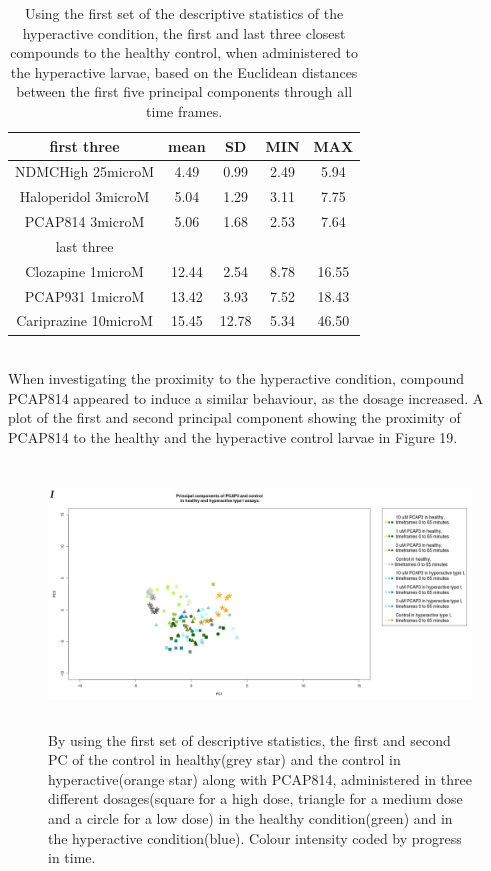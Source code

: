 \documentclass[a4paper,12pt]{article}
\begin{document}
\begin{table}[h!]\tiny
\centering
\begin{tabular}{|c|c|c|c|c|}
\hline
first three          & mean  & SD    & MIN  & MAX   \\ \hline
NDMCHigh 25microM    & 4.49  & 0.99  & 2.49 & 5.94  \\ \hline
Haloperidol 3microM  & 5.04  & 1.29  & 3.11 & 7.75  \\ \hline
PCAP814 3microM      & 5.06  & 1.68  & 2.53 & 7.64  \\ \hline
last three           & \multicolumn{4}{c|}{}        \\ \hline
Clozapine 1microM    & 12.44 & 2.54  & 8.78 & 16.55 \\ \hline
PCAP931 1microM      & 13.42 & 3.93  & 7.52 & 18.43 \\ \hline
Cariprazine 10microM & 15.45 & 12.78 & 5.34 & 46.50  \\ \hline
\end{tabular}
\caption{Using the first set of the descriptive statistics of the hyperactive condition, the first and last three closest compounds to the healthy control, when administered to the hyperactive larvae, based on the Euclidean distances between the first five principal components through all time frames.}
\end{table}
\\When investigating the proximity to the hyperactive condition, compound PCAP814 appeared to induce a similar behaviour, as the dosage increased. A plot of the first and second principal component showing the proximity of PCAP814 to the healthy and the hyperactive control larvae in Figure 19.
\begin{figure}[h!]
\begin{center}
\includegraphics[width=14cm,height=7cm]{PCAP814_Control_DarkApoHigh.png}
\caption{By using the first set of descriptive statistics, the first and second PC of the control in healthy(grey star) and the control in hyperactive(orange star) along with PCAP814, administered in three different dosages(square for a high dose, triangle for a medium dose and a circle for a low dose) in the healthy condition(green) and in the hyperactive condition(blue). Colour intensity coded by progress in time.}
\end{center}
\end{figure}
\end{document}
